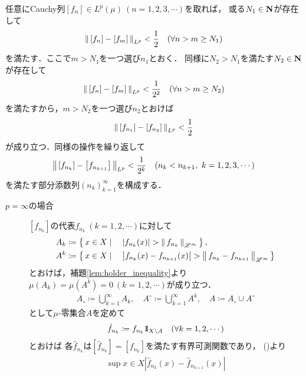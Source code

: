 \begin{prf}
	任意にCauchy列$[f_n] \in L^p(\mu)\ (n=1,2,3,\cdots)$を取れば，
	或る$N_1 \in \mathbf{N}$が存在して
	\begin{align}
		\left\|\, [f_n]-[f_m]\, \right\|_{L^p} < \frac{1}{2}
		\quad (\forall n > m \geq N_1)
	\end{align}
	を満たす．ここで$m > N_1$を一つ選び$n_1$とおく．
	同様に$N_2 > N_1$を満たす$N_2 \in \mathbf{N}$が存在して
	\begin{align}
		\left\|\, [f_n]-[f_m]\, \right\|_{L^p} < \frac{1}{2^2}
		\quad (\forall n > m \geq N_2)
	\end{align}
	を満たすから，$m > N_2$を一つ選び$n_2$とおけば
	\begin{align}
		\left\|\, \left[f_{n_1}\right] - \left[f_{n_2}\right]\, \right\|_{L^p} < \frac{1}{2}
	\end{align}
	が成り立つ．同様の操作を繰り返して
	\begin{align}
		\left\|\, \left[f_{n_k}\right] - \left[f_{n_{k+1}}\right]\, \right\|_{L^p} < \frac{1}{2^k} 
		\quad (n_k < n_{k+1},\ k=1,2,3,\cdots) \label{ineq:Lp_banach_2}
	\end{align}
	を満たす部分添数列$(n_k)_{k=1}^{\infty}$を構成する．
	\begin{description}
		\item[$p = \infty$の場合]
			$\left[f_{n_k}\right]$の代表$f_{n_k}\ (k=1,2,\cdots)$に対して
			\begin{align}
				A_k &\coloneqq \left\{\, x \in X \mid \quad \left| f_{n_k}(x) \right| > \left\|\, f_{n_k}\, \right\|_{\mathscr{L}^\infty}\, \right\}, \\
				A^k &\coloneqq \left\{\, x \in X \mid \quad \left| f_{n_k}(x) - f_{n_{k+1}}(x) \right| > \left\|\, f_{n_k} - f_{n_{k+1}}\, \right\|_{\mathscr{L}^\infty}\, \right\}
			\end{align}
			とおけば，補題\ref{lem:holder_inequality}より$\mu(A_k) = \mu(A^k) = 0\ (k=1,2,\cdots)$が成り立つ．
			\begin{align}
				A_\circ \coloneqq \bigcup_{k=1}^{\infty} A_k,
				\quad A^\circ \coloneqq \bigcup_{k=1}^{\infty}A^k,
				\quad A \coloneqq A_\circ \cup A^\circ
			\end{align}
			として$\mu$-零集合$A$を定めて
			\begin{align}
				\hat{f}_{n_k} \coloneqq f_{n_k} \mbox{1}\hspace{-0.25em}\mbox{l}_{X \backslash A}
				\quad (\forall k=1,2,\cdots)
			\end{align}
			とおけば
			各$\hat{f}_{n_k}$は$\left[\hat{f}_{n_k}\right] = \left[f_{n_k}\right]$を満たす有界可測関数であり，
			()より
			\begin{align}
				\sup{x \in X}{\left|\hat{f}_{n_k}(x) - \hat{f}_{n_{k+1}}(x)\right|}

\end{align}
\end{description}
\end{prf}
